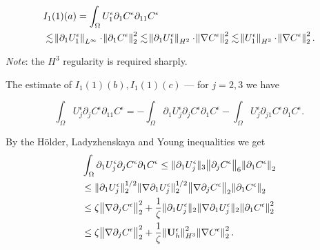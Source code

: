 \documentclass{beamer}
\begin{document}
\begin{frame}

\changefontsizes{11pt}

\begin{equation} \nonumber
  \begin{split}
    & I_1(1)(a) = \int_\Omega U_1^\epsilon \partial_1 C^\epsilon \partial_{11} C^\epsilon \\
    & \lesssim \norm{\partial_1 U_1^\epsilon}_{L^\infty} \cdot \norm{\partial_1 C^\epsilon}_2^2 \lesssim \norm{\partial_1 U_1^\epsilon}_{H^2} \cdot \norm{\nabla C^\epsilon}_2^2 \lesssim \norm{U_1^\epsilon}_{H^3} \cdot \norm{\nabla C^\epsilon}_2^2.
  \end{split}
\end{equation}

\textit{Note}: the $H^3$ regularity is required sharply.

The estimate of $I_1(1)(b), I_1(1)(c)$ --- for $j = 2,3$ we have

$$ \int_\Omega U_j^\epsilon \partial_j C^\epsilon \partial_{11} C^\epsilon = - \int_\Omega \partial_1 U_j^\epsilon \partial_j C^\epsilon \partial_1 C^\epsilon - \int_\Omega U_j^\epsilon \partial_{j1} C^\epsilon \partial_1 C^\epsilon.$$

By the H\"older, Ladyzhenskaya and Young inequalities we get
\begin{equation} \nonumber
  \begin{split}
    & \int_\Omega \partial_1 U_j^\epsilon \partial_j C^\epsilon \partial_1 C^\epsilon \leq \| \partial_1 U_j^\epsilon \| _3 \norm{\partial_j C^\epsilon}_6 \norm{\partial_1 C^\epsilon}_2 \\
    & \leq \| \partial_1 U_j^\epsilon \|_2^{1/2} \|\nabla \partial_1 U_j^\epsilon \|_2^{1/2} \norm{\nabla \partial_j C^\epsilon}_2 \norm{\partial_1 C^\epsilon}_2 \\
    & \leq \zeta \norm{\nabla \partial_j C^\epsilon}_2^2 + \frac{1}{\zeta} \| \partial_1 U_j^\epsilon \|_2 \|\nabla \partial_1 U_j^\epsilon \|_2 \norm{\partial_1 C^\epsilon}_2^2 \\
    & \leq \zeta \norm{\nabla \partial_j C^\epsilon}_2^2 + \frac{1}{\zeta} \norm{\mathbf{U}_h^\epsilon}_{H^3}^2 \norm{\nabla C^\epsilon}_2^2.
  \end{split}
\end{equation}

\end{frame}
\end{document}
